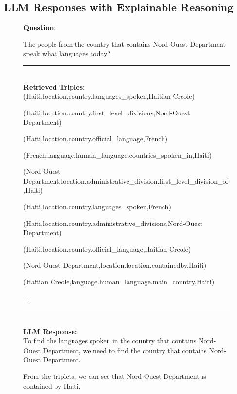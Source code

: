 \subsection{LLM Responses with Explainable Reasoning}

\begin{figure}
\begin{tcolorbox}[colback=gray!5!white, colframe=gray!75!black, title=CWQ-WebQTest-100\_bf66fd89b6e9fc5fcb96c8b3f7a0e616]
\scriptsize

\textbf{Question:}\\
\raggedright The people from the country that contains Nord-Ouest Department speak what languages today?

\rule{\linewidth}{0.4pt}
\\

\textbf{Retrieved Triples:}\\
(Haiti,location.country.languages\_spoken,Haitian Creole)

(Haiti,location.country.first\_level\_divisions,Nord-Ouest Department)

(Haiti,location.country.official\_language,French)

(French,language.human\_language.countries\_spoken\_in,Haiti)

(Nord-Ouest Department,location.administrative\_division.first\_level\_division\_of,Haiti)

(Haiti,location.country.languages\_spoken,French)

(Haiti,location.country.administrative\_divisions,Nord-Ouest Department)

(Haiti,location.country.official\_language,Haitian Creole)

(Nord-Ouest Department,location.location.containedby,Haiti)

(Haitian Creole,language.human\_language.main\_country,Haiti)

...

\rule{\linewidth}{0.4pt}
\\

\textbf{LLM Response:}\\
To find the languages spoken in the country that contains Nord-Ouest Department, we need to find the country that contains Nord-Ouest Department.



From the triplets, we can see that Nord-Ouest Department is contained by Haiti.




\end{tcolorbox}
\end{figure}
